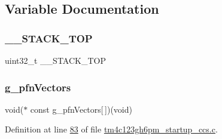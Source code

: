 \subsection{Variable Documentation}
\mbox{\label{tm4c123gh6pm__startup__ccs_8c_ac1f2b7c32de8681c4f4184ca6efca568}} 
\subsubsection{\texorpdfstring{\_\_STACK\_TOP}{\_\_STACK\_TOP}}
{\footnotesize\ttfamily uint32\+\_\+t \+\_\+\+\_\+\+S\+T\+A\+C\+K\+\_\+\+T\+OP}

\mbox{\label{tm4c123gh6pm__startup__ccs_8c_a28c770c8f2522f11e2a95f7486620c5b}} 
\subsubsection{\texorpdfstring{g\_pfnVectors}{g\_pfnVectors}}
{\footnotesize\ttfamily void($\ast$ const g\+\_\+pfn\+Vectors\mbox{[}$\,$\mbox{]})(void)}



Definition at line \mbox{\hyperlink{tm4c123gh6pm__startup__ccs_8c_source_l00083}{83}} of file \mbox{\hyperlink{tm4c123gh6pm__startup__ccs_8c_source}{tm4c123gh6pm\+\_\+startup\+\_\+ccs.\+c}}.

